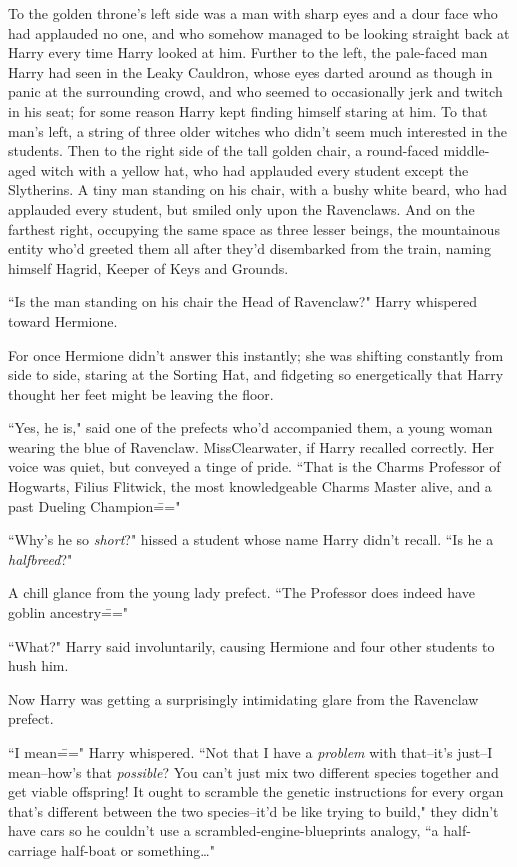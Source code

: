 To the golden throne's left side was a man with sharp eyes and a dour face who had applauded no one, and who somehow managed to be looking straight back at Harry every time Harry looked at him. Further to the left, the pale-faced man Harry had seen in the Leaky Cauldron, whose eyes darted around as though in panic at the surrounding crowd, and who seemed to occasionally jerk and twitch in his seat; for some reason Harry kept finding himself staring at him. To that man's left, a string of three older witches who didn't seem much interested in the students. Then to the right side of the tall golden chair, a round-faced middle-aged witch with a yellow hat, who had applauded every student except the Slytherins. A tiny man standing on his chair, with a bushy white beard, who had applauded every student, but smiled only upon the Ravenclaws. And on the farthest right, occupying the same space as three lesser beings, the mountainous entity who'd greeted them all after they'd disembarked from the train, naming himself Hagrid, Keeper of Keys and Grounds.

``Is the man standing on his chair the Head of Ravenclaw?" Harry whispered toward Hermione.

For once Hermione didn't answer this instantly; she was shifting constantly from side to side, staring at the Sorting Hat, and fidgeting so energetically that Harry thought her feet might be leaving the floor.

``Yes, he is," said one of the prefects who'd accompanied them, a young woman wearing the blue of Ravenclaw. Miss\?Clearwater, if Harry recalled correctly. Her voice was quiet, but conveyed a tinge of pride. ``That is the Charms Professor of Hogwarts, Filius Flitwick, the most knowledgeable Charms Master alive, and a past Dueling Champion\==="

``Why's he so \emph{short}?" hissed a student whose name Harry didn't recall. ``Is he a \emph{halfbreed}?"

A chill glance from the young lady prefect. ``The Professor does indeed have goblin ancestry\==="

``What?" Harry said involuntarily, causing Hermione and four other students to hush him.

Now Harry was getting a surprisingly intimidating glare from the Ravenclaw prefect.

``I mean\===" Harry whispered. ``Not that I have a \emph{problem} with that\---it's just\---I mean\---how's that \emph{possible}? You can't just mix two different species together and get viable offspring! It ought to scramble the genetic instructions for every organ that's different between the two species\---it'd be like trying to build," they didn't have cars so he couldn't use a scrambled-engine-blueprints analogy, ``a half-carriage half-boat or something{\ldots}"

